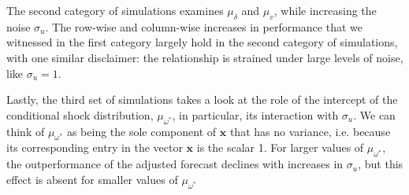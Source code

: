 \documentclass{uiucthesis2021}
\newcommand{\x}{\textbf{x}}
\theoremstyle{definition}
\begin{document}
The second category of simulations examines $\mu_{\delta}$ and $\mu_{v}$, while increasing the noise $\sigma_{u}$.  The row-wise and column-wise increases in performance that we witnessed in the first category largely hold in the second category of simulations, with one similar disclaimer: the relationship is strained under large levels of noise, like $\sigma_{u} = 1$.

Lastly, the third set of simulations takes a look at the role of the intercept of the conditional shock distribution, $\mu_{\omega^{*}}$, in particular, its interaction with $\sigma_{u}$.  We can think of $\mu_{\omega^{*}}$ as being the sole component of $\x$ that has no variance, i.e. because its corresponding entry in the vector $\x$ is the scalar 1.  For larger values of $\mu_{\omega^{*}}$, the outperformance of the adjusted forecast declines with increases in $\sigma_{u}$, but this effect is absent for smaller values of $\mu_{\omega^{*}}$ 
\end{document}
